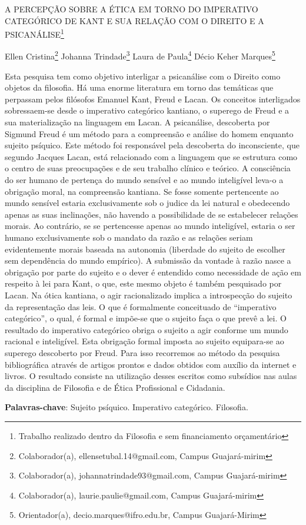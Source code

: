 \documentclass[article,12pt,onesidea,4paper,english,brazil]{abntex2}
\begin{document}
	
	
	\frenchspacing 
	
	\begin{center}
		\LARGE A PERCEPÇÃO SOBRE A ÉTICA EM TORNO DO IMPERATIVO CATEGÓRICO
		DE KANT E SUA RELAÇÃO COM O DIREITO E A PSICANÁLISE\footnote{Trabalho realizado dentro da Filosofia e sem financiamento orçamentário}
		
		\normalsize
		Ellen Cristina\footnote{Colaborador(a), ellensetubal.14@gmail.com, Campus Guajará-mirim} 
		Johanna Trindade\footnote{Colaborador(a), johannatrindade93@gmail.com, Campus Guajará-mirim} 
		Laura de Paula\footnote{Colaborador(a), laurie.paulie@gmail.com, Campus Guajará-mirim} 
		Décio Keher Marques\footnote{Orientador(a), decio.marques@ifro.edu.br, Campus Guajará-Mirim} 
	\end{center}
	
	\noindent Esta pesquisa tem como objetivo interligar a psicanálise com o Direito como objetos
	da filosofia. Há uma enorme literatura em torno das temáticas que perpassam pelos filósofos Emanuel Kant, Freud e Lacan. Os conceitos interligados sobressaem-se
	desde o imperativo categórico kantiano, o superego de Freud e a sua materialização na linguagem em Lacan. A psicanálise, descoberta por Sigmund Freud é um método para a compreensão e análise do homem enquanto sujeito psíquico. Este método foi responsável pela descoberta do inconsciente, que segundo Jacques Lacan, está relacionado com a linguagem que se estrutura como o centro de suas preocupações e de seu trabalho clínico e teórico. A consciência do ser humano de pertença do mundo sensível e ao mundo inteligível leva-o a obrigação moral, na compreensão kantiana. Se fosse somente pertencente ao mundo sensível estaria exclusivamente sob o judice da lei natural e obedecendo apenas as suas inclinações, não havendo a possibilidade de se estabelecer relações morais. Ao contrário, se se pertencesse apenas ao mundo inteligível, estaria o ser humano exclusivamente sob o mandato da razão e as relações seriam evidentemente morais baseada na autonomia (liberdade do sujeito de escolher sem dependência do mundo empírico). A submissão da vontade à razão nasce a obrigação por parte do sujeito e o dever é entendido como necessidade de ação em respeito à lei para Kant, o que, este mesmo objeto é também pesquisado por Lacan. Na ótica kantiana, o agir racionalizado implica a introspecção do sujeito da representação das leis. O que é formalmente conceituado de “imperativo categórico”, o qual, é formal e impõe-se que o sujeito faça o que prevê a lei. O resultado do imperativo categórico obriga o sujeito a agir conforme um mundo racional e inteligível. Esta obrigação formal imposta ao sujeito equipara-se ao superego descoberto por Freud. Para isso recorremos ao método da pesquisa bibliográfica através de artigos prontos e dados obtidos com auxílio da internet e livros. O resultado consiste na utilização desses escritos como subsídios nas aulas da disciplina de Filosofia e de Ética Profissional e Cidadania.
	
	\vspace{\onelineskip}
	
	\noindent
	\textbf{Palavras-chave}: Sujeito psíquico. Imperativo categórico. Filosofia.
	
\end{document}
